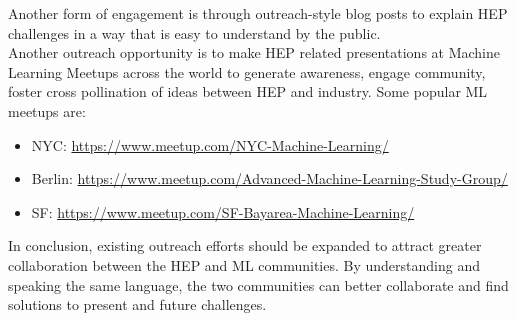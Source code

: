 Another form of engagement is through outreach-style blog posts to explain HEP challenges in a way that is easy to understand by the public.\\

Another outreach opportunity is to make HEP related presentations at Machine Learning Meetups across the world to generate awareness, engage community, foster cross pollination of ideas between HEP and industry. Some popular ML meetups are:
\begin{itemize}
 \item NYC: \url{https://www.meetup.com/NYC-Machine-Learning/}
 \item Berlin: \url{https://www.meetup.com/Advanced-Machine-Learning-Study-Group/}
 \item SF: \url{https://www.meetup.com/SF-Bayarea-Machine-Learning/}
\end{itemize}

In conclusion, existing outreach efforts should be expanded to attract greater collaboration between the HEP and ML communities. By understanding and speaking the same language, the two communities can better collaborate and find solutions to present and future challenges.

